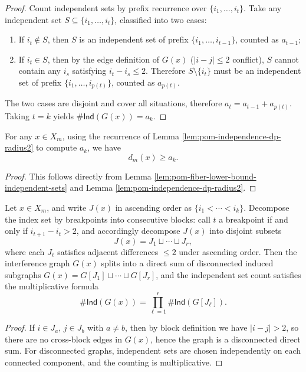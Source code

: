 \begin{proof}
Count independent sets by prefix recurrence over $\{i_1,\dots,i_t\}$.
Take any independent set $S\subseteq\{i_1,\dots,i_t\}$, classified into two cases:
\begin{enumerate}
  \item If $i_t\notin S$, then $S$ is an independent set of prefix $\{i_1,\dots,i_{t-1}\}$, counted as $a_{t-1}$;
  \item If $i_t\in S$, then by the edge definition of $G(x)$ ($|i-j|\le 2$ conflict), $S$ cannot contain any $i_s$ satisfying $i_t-i_s\le 2$. Therefore $S\setminus\{i_t\}$ must be an independent set of prefix $\{i_1,\dots,i_{p(t)}\}$, counted as $a_{p(t)}$.
\end{enumerate}
The two cases are disjoint and cover all situations, therefore $a_t=a_{t-1}+a_{p(t)}$.
Taking $t=k$ yields $\#\mathsf{Ind}(G(x))=a_k$.
\end{proof}

\begin{corollary}\label{cor:pom-fiber-lower-bound-dp}
For any $x\in X_m$, using the recurrence of Lemma \ref{lem:pom-independence-dp-radius2} to compute $a_k$, we have
\[
d_m(x)\ge a_k.
\]
\end{corollary}

\begin{proof}
This follows directly from Lemma \ref{lem:pom-fiber-lower-bound-independent-sets} and Lemma \ref{lem:pom-independence-dp-radius2}.
\end{proof}

\begin{lemma}\label{lem:pom-ind-factorization}
Let $x\in X_m$, and write $J(x)$ in ascending order as $\{i_1<\cdots<i_k\}$.
Decompose the index set by breakpoints into consecutive blocks: call $t$ a breakpoint if and only if $i_{t+1}-i_t>2$, and accordingly decompose $J(x)$ into disjoint subsets
\[
J(x)=J_1\sqcup\cdots\sqcup J_r,
\]
where each $J_\ell$ satisfies adjacent differences $\le 2$ under ascending order.
Then the interference graph $G(x)$ splits into a direct sum of disconnected induced subgraphs
\(
G(x)=G[J_1]\sqcup\cdots\sqcup G[J_r]
\),
and the independent set count satisfies the multiplicative formula
\[
\#\mathsf{Ind}(G(x))=\prod_{\ell=1}^r \#\mathsf{Ind}(G[J_\ell]).
\]
\end{lemma}

\begin{proof}
If $i\in J_a$, $j\in J_b$ with $a\neq b$, then by block definition we have $|i-j|>2$, so there are no cross-block edges in $G(x)$, hence the graph is a disconnected direct sum.
For disconnected graphs, independent sets are chosen independently on each connected component, and the counting is multiplicative.
\end{proof}

